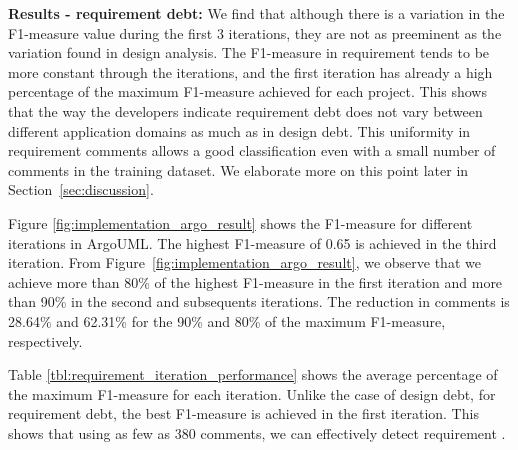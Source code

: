 \noindent \textbf{Results - requirement debt:} We find that although there is a variation in the F1-measure value during the first 3 iterations, they are not as preeminent as the variation found in design \SATD analysis. The F1-measure in requirement \SATD tends to be more constant through the iterations, and the first iteration has already a high percentage of the maximum F1-measure achieved for each project. This shows that the way the developers indicate requirement debt does not vary between different application domains as much as in design debt. This uniformity in requirement \SATD comments allows a good classification even with a small number of comments in the training dataset. We elaborate more on this point later in Section~\ref{sec:discussion}.

Figure \ref{fig:implementation_argo_result} shows the F1-measure for different iterations in ArgoUML. The highest F1-measure of 0.65 is achieved in the third iteration. From Figure~\ref{fig:implementation_argo_result}, we observe that we achieve more than 80\% of the highest F1-measure in the first iteration and more than 90\% in the second and subsequents iterations. The reduction in comments is 28.64\% and 62.31\% for the 90\% and 80\% of the maximum F1-measure, respectively.



Table \ref{tbl:requirement_iteration_performance} shows the average percentage of the maximum F1-measure for each iteration. Unlike the case of design debt, for requirement debt, the best F1-measure is achieved in the first iteration. This shows that using as few as 380 comments, we can effectively detect requirement \SATD.

